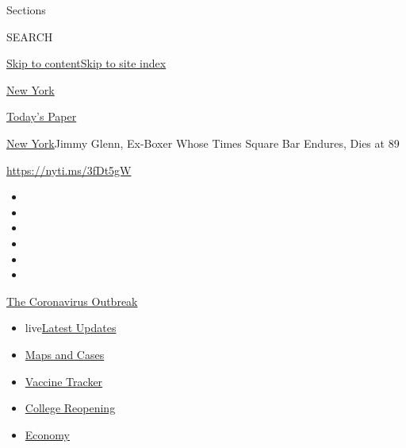 Sections

SEARCH

\protect\hyperlink{site-content}{Skip to
content}\protect\hyperlink{site-index}{Skip to site index}

\href{https://www.nytimes3xbfgragh.onion/section/nyregion}{New York}

\href{https://myaccount.nytimes3xbfgragh.onion/auth/login?response_type=cookie\&client_id=vi}{}

\href{https://www.nytimes3xbfgragh.onion/section/todayspaper}{Today's
Paper}

\href{/section/nyregion}{New York}\textbar{}Jimmy Glenn, Ex-Boxer Whose
Times Square Bar Endures, Dies at 89

\url{https://nyti.ms/3fDt5gW}

\begin{itemize}
\item
\item
\item
\item
\item
\item
\end{itemize}

\href{https://www.nytimes3xbfgragh.onion/news-event/coronavirus?action=click\&pgtype=Article\&state=default\&region=TOP_BANNER\&context=storylines_menu}{The
Coronavirus Outbreak}

\begin{itemize}
\tightlist
\item
  live\href{https://www.nytimes3xbfgragh.onion/2020/08/04/world/coronavirus-covid-19.html?action=click\&pgtype=Article\&state=default\&region=TOP_BANNER\&context=storylines_menu}{Latest
  Updates}
\item
  \href{https://www.nytimes3xbfgragh.onion/interactive/2020/us/coronavirus-us-cases.html?action=click\&pgtype=Article\&state=default\&region=TOP_BANNER\&context=storylines_menu}{Maps
  and Cases}
\item
  \href{https://www.nytimes3xbfgragh.onion/interactive/2020/science/coronavirus-vaccine-tracker.html?action=click\&pgtype=Article\&state=default\&region=TOP_BANNER\&context=storylines_menu}{Vaccine
  Tracker}
\item
  \href{https://www.nytimes3xbfgragh.onion/2020/08/02/us/covid-college-reopening.html?action=click\&pgtype=Article\&state=default\&region=TOP_BANNER\&context=storylines_menu}{College
  Reopening}
\item
  \href{https://www.nytimes3xbfgragh.onion/live/2020/08/03/business/stock-market-today-coronavirus?action=click\&pgtype=Article\&state=default\&region=TOP_BANNER\&context=storylines_menu}{Economy}
\end{itemize}


